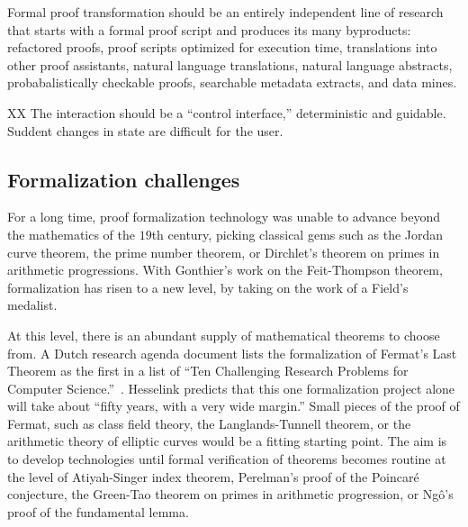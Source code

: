 \documentclass{llncs}
\begin{document}
Formal proof transformation should be an entirely independent line of
research that starts with a formal proof script and produces its many
byproducts: refactored proofs, proof scripts optimized for execution
time, translations into other proof assistants, natural language 
translations, natural language abstracts, probabalistically checkable
proofs, searchable metadata extracts, and data mines.






XX The interaction should be a ``control interface,'' deterministic and guidable.
Suddent changes in state are difficult for the user.




\subsection{Formalization challenges}

For a long time, proof formalization technology was unable to advance beyond
the mathematics
of the $19$th century, picking classical gems
such as the Jordan curve theorem, the prime number theorem, or
Dirchlet's theorem on primes in arithmetic progressions.  With
Gonthier's work on the Feit-Thompson theorem, formalization has risen
to a new level, by taking on the work of a Field's medalist.

At this level, there is an abundant supply of mathematical theorems to
choose from.  A Dutch research agenda document
lists the formalization of Fermat's Last Theorem as the first in a
list of ``Ten Challenging Research Problems for Computer
Science.''~\cite{Berg}.  Hesselink predicts that this one
formalization project alone will take about ``fifty years, with a very
wide margin.''
Small pieces of the proof of Fermat, such as class field theory, the
Langlands-Tunnell theorem, or the arithmetic theory of elliptic curves
would be a fitting starting point.  The aim is to develop
technologies until formal verification of theorems
becomes routine at the level of Atiyah-Singer index theorem,
Perelman's proof of the Poincar\'e conjecture, the Green-Tao theorem
on primes in arithmetic progression, or Ng\^o's proof of the
fundamental lemma.
\end{document}
